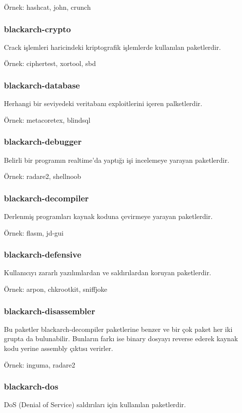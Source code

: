 \documentclass[a4paper, oneside, 11pt]{book}
\begin{document}
Örnek: hashcat, john, crunch

\subsubsection{blackarch-crypto}
Crack işlemleri haricindeki kriptografik işlemlerde kullanılan paketlerdir.

Örnek: ciphertest, xortool, sbd

\subsubsection{blackarch-database}
Herhangi bir seviyedeki veritabanı exploitlerini içeren palketlerdir.

Örnek: metacoretex, blindsql

\subsubsection{blackarch-debugger}
Belirli bir programın realtime'da yaptığı işi incelemeye yarayan paketlerdir.

Örnek: radare2, shellnoob

\subsubsection{blackarch-decompiler}
Derlenmiş programları kaynak koduna çevirmeye yarayan paketlerdir.

Örnek: flasm, jd-gui

\subsubsection{blackarch-defensive}
Kullanıcıyı zararlı yazılımlardan ve saldırılardan koruyan paketlerdir.

Örnek: arpon, chkrootkit, sniffjoke

\subsubsection{blackarch-disassembler}
Bu paketler blackarch-decompiler paketlerine benzer ve bir çok paket her iki grupta da bulunabilir. Bunların farkı ise binary dosyayı reverse ederek kaynak kodu yerine assembly çıktısı verirler.

Örnek: inguma, radare2

\subsubsection{blackarch-dos}
DoS (Denial of Service) saldırıları için kullanılan paketlerdir.
\end{document}
